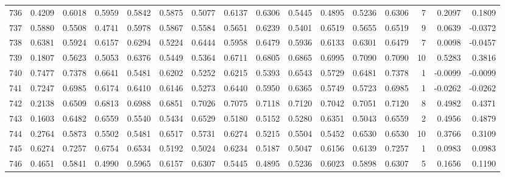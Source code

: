 \begin{tabular}{lrrrrrrrrrrrrrrr}
736 &      0.4209 &  0.6018 &  0.5959 &  0.5842 &  0.5875 &  0.5077 &  0.6137 &  0.6306 &  0.5445 &  0.4895 &   0.5236 &     0.6306 &      7 &                    0.2097 &                     0.1809 \\
737 &      0.5880 &  0.5508 &  0.4741 &  0.5978 &  0.5867 &  0.5584 &  0.5651 &  0.6239 &  0.5401 &  0.6519 &   0.5655 &     0.6519 &      9 &                    0.0639 &                    -0.0372 \\
738 &      0.6381 &  0.5924 &  0.6157 &  0.6294 &  0.5224 &  0.6444 &  0.5958 &  0.6479 &  0.5936 &  0.6133 &   0.6301 &     0.6479 &      7 &                    0.0098 &                    -0.0457 \\
739 &      0.1807 &  0.5623 &  0.5053 &  0.6376 &  0.5449 &  0.5364 &  0.6711 &  0.6805 &  0.6865 &  0.6995 &   0.7090 &     0.7090 &     10 &                    0.5283 &                     0.3816 \\
740 &      0.7477 &  0.7378 &  0.6641 &  0.5481 &  0.6202 &  0.5252 &  0.6215 &  0.5393 &  0.6543 &  0.5729 &   0.6481 &     0.7378 &      1 &                   -0.0099 &                    -0.0099 \\
741 &      0.7247 &  0.6985 &  0.6174 &  0.6410 &  0.6146 &  0.5273 &  0.6440 &  0.5950 &  0.6365 &  0.5749 &   0.5723 &     0.6985 &      1 &                   -0.0262 &                    -0.0262 \\
742 &      0.2138 &  0.6509 &  0.6813 &  0.6988 &  0.6851 &  0.7026 &  0.7075 &  0.7118 &  0.7120 &  0.7042 &   0.7051 &     0.7120 &      8 &                    0.4982 &                     0.4371 \\
743 &      0.1603 &  0.6482 &  0.6559 &  0.5540 &  0.5434 &  0.6529 &  0.5180 &  0.5152 &  0.5280 &  0.6351 &   0.5043 &     0.6559 &      2 &                    0.4956 &                     0.4879 \\
744 &      0.2764 &  0.5873 &  0.5502 &  0.5481 &  0.6517 &  0.5731 &  0.6274 &  0.5215 &  0.5504 &  0.5452 &   0.6530 &     0.6530 &     10 &                    0.3766 &                     0.3109 \\
745 &      0.6274 &  0.7257 &  0.6754 &  0.6534 &  0.5192 &  0.5024 &  0.6234 &  0.5187 &  0.5047 &  0.6156 &   0.6139 &     0.7257 &      1 &                    0.0983 &                     0.0983 \\
746 &      0.4651 &  0.5841 &  0.4990 &  0.5965 &  0.6157 &  0.6307 &  0.5445 &  0.4895 &  0.5236 &  0.6023 &   0.5898 &     0.6307 &      5 &                    0.1656 &                     0.1190 \\

\end{tabular}
